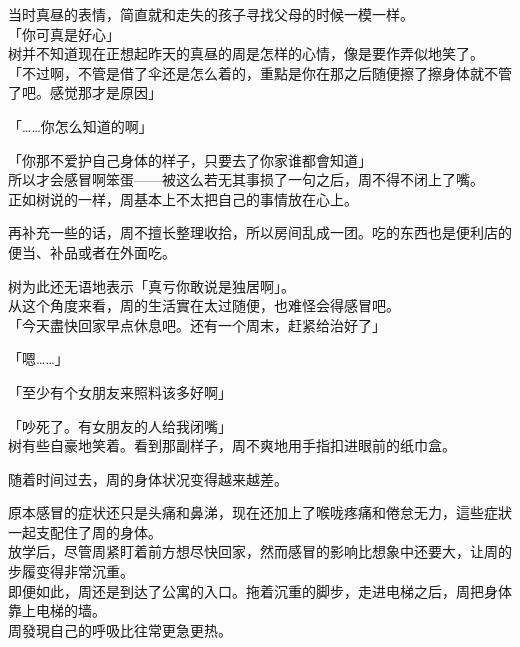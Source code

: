 当时真昼的表情，简直就和走失的孩子寻找父母的时候一模一样。\\

「你可真是好心」\\

树并不知道现在正想起昨天的真昼的周是怎样的心情，像是要作弄似地笑了。\\

「不过啊，不管是借了伞还是怎么着的，重點是你在那之后随便擦了擦身体就不管了吧。感觉那才是原因」

「……你怎么知道的啊」

「你那不爱护自己身体的样子，只要去了你家谁都會知道」\\

所以才会感冒啊笨蛋——被这么若无其事损了一句之后，周不得不闭上了嘴。\\

正如树说的一样，周基本上不太把自己的事情放在心上。

再补充一些的话，周不擅长整理收拾，所以房间乱成一团。吃的东西也是便利店的便当、补品或者在外面吃。

树为此还无语地表示「真亏你敢说是独居啊」。\\

从这个角度来看，周的生活實在太过随便，也难怪会得感冒吧。\\

「今天盡快回家早点休息吧。还有一个周末，赶紧给治好了」

「嗯……」

「至少有个女朋友来照料该多好啊」

「吵死了。有女朋友的人给我闭嘴」\\

树有些自豪地笑着。看到那副样子，周不爽地用手指扣进眼前的纸巾盒。\\

\vspace{2\baselineskip}

随着时间过去，周的身体状况变得越来越差。

原本感冒的症状还只是头痛和鼻涕，现在还加上了喉咙疼痛和倦怠无力，這些症狀一起支配住了周的身体。\\

放学后，尽管周紧盯着前方想尽快回家，然而感冒的影响比想象中还要大，让周的步履变得非常沉重。\\

即便如此，周还是到达了公寓的入口。拖着沉重的脚步，走进电梯之后，周把身体靠上电梯的墙。\\

周發現自己的呼吸比往常更急更热。\\

